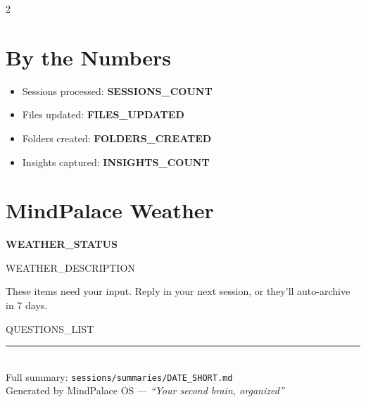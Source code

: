 \documentclass[10pt,a4paper]{article}
\begin{document}
\vspace{0.5em}

\begin{multicols}{2}

\section*{By the Numbers}

\begin{itemize}[leftmargin=1.5em]
  \item Sessions processed: \textbf{{{SESSIONS_COUNT}}}
  \item Files updated: \textbf{{{FILES_UPDATED}}}
  \item Folders created: \textbf{{{FOLDERS_CREATED}}}
  \item Insights captured: \textbf{{{INSIGHTS_COUNT}}}
\end{itemize}

\columnbreak

\section*{MindPalace Weather}

{\large \textbf{{{WEATHER_STATUS}}}}

\small {{WEATHER_DESCRIPTION}}

\end{multicols}

\vspace{0.5em}

\begin{tcolorbox}[questionbox, title={Questions for the Reader}]
\small
These items need your input. Reply in your next session, or they'll auto-archive in 7 days.

\begin{enumerate}[leftmargin=1.5em]
{{QUESTIONS_LIST}}
\end{enumerate}
\end{tcolorbox}

\vspace{1em}

\begin{center}
\rule{0.8\textwidth}{0.5pt}\\[0.5em]
{\small\color{gray}
Full summary: \texttt{sessions/summaries/{{DATE_SHORT}}.md} \\
Generated by MindPalace OS --- \textit{``Your second brain, organized''}}
\end{center}
\end{document}
